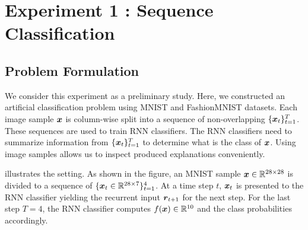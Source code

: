

 

\section{Experiment 1 : Sequence Classification}
\label{sec:exp1}

\subsection{Problem Formulation}
We consider this experiment as a preliminary study. Here, we constructed an artificial classification problem using MNIST and FashionMNIST datasets. Each image sample $\boldsymbol{x}$ is column-wise split into a sequence of non-overlapping $\{ \boldsymbol{x}_t \}_{t=1}^{T}$. These sequences are used to train RNN classifiers. The RNN classifiers need to summarize information from $\{ \boldsymbol{x}_t \}_{t=1}^{T}$ to determine what is the class of $\boldsymbol{x}$.  Using image samples allows us to inspect produced explanations conveniently.

\addfigure{\ref{fig:artificial_problem}} illustrates the setting. As shown in the figure, an MNIST sample $ \patvector{x} \in \mathbb{R}^{28 \times 28}$ is divided to a sequence of $\{ \patvector{x}_t \in   \mathbb{R}^{28 \times 7} \}_{t=1} ^ 4$. At  a time step $t$, $\patvector{x}_t$ is presented to the RNN classifier yielding the recurrent input $\patvector{r}_{t+1}$ for the next step. For the last step $T = 4$, the RNN classifier computes $f(\boldsymbol{x}) \in \mathbb{R}^{10}$ and the class probabilities accordingly.


